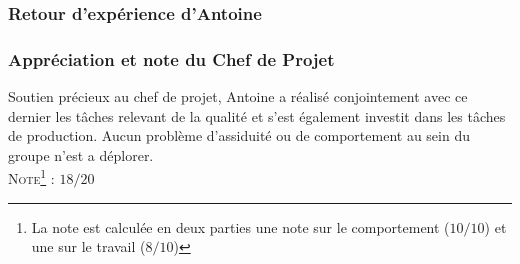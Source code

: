 \subsubsection{Retour d'expérience d'Antoine}


\subsubsection{Appréciation et note du Chef de Projet}

Soutien précieux au chef de projet, Antoine a réalisé conjointement avec ce dernier les tâches relevant de la qualité et s’est également investit dans les tâches de production.
Aucun problème d’assiduité ou de comportement au sein du groupe n’est a déplorer.\\

\noindent\textsc{Note\footnote{La note est calculée en deux parties une note sur le comportement ($10/10$) et une sur le travail ($8/10$)} :} $18/20$